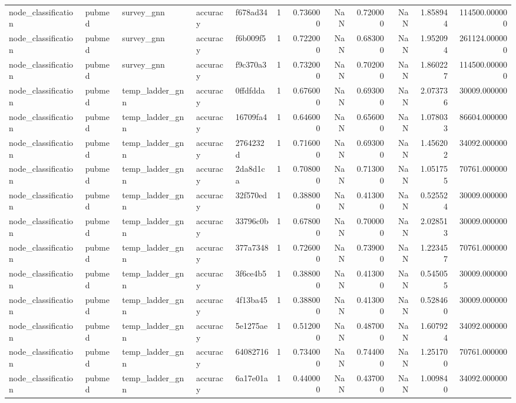 \begin{tabular}{lllllrrrrrrr}
node_classification & pubmed & survey_gnn & accuracy & f678ad34 & 1 & 0.736000 & NaN & 0.720000 & NaN & 1.858944 & 114500.000000 \\
node_classification & pubmed & survey_gnn & accuracy & f6b009f5 & 1 & 0.722000 & NaN & 0.683000 & NaN & 1.952094 & 261124.000000 \\
node_classification & pubmed & survey_gnn & accuracy & f9c370a3 & 1 & 0.732000 & NaN & 0.702000 & NaN & 1.860227 & 114500.000000 \\
node_classification & pubmed & temp_ladder_gnn & accuracy & 0ffdfdda & 1 & 0.676000 & NaN & 0.693000 & NaN & 2.073736 & 30009.000000 \\
node_classification & pubmed & temp_ladder_gnn & accuracy & 16709fa4 & 1 & 0.646000 & NaN & 0.656000 & NaN & 1.078033 & 86604.000000 \\
node_classification & pubmed & temp_ladder_gnn & accuracy & 2764232d & 1 & 0.716000 & NaN & 0.693000 & NaN & 1.456202 & 34092.000000 \\
node_classification & pubmed & temp_ladder_gnn & accuracy & 2da8d1ca & 1 & 0.708000 & NaN & 0.713000 & NaN & 1.051755 & 70761.000000 \\
node_classification & pubmed & temp_ladder_gnn & accuracy & 32f570ed & 1 & 0.388000 & NaN & 0.413000 & NaN & 0.525524 & 30009.000000 \\
node_classification & pubmed & temp_ladder_gnn & accuracy & 33796c0b & 1 & 0.678000 & NaN & 0.700000 & NaN & 2.028513 & 30009.000000 \\
node_classification & pubmed & temp_ladder_gnn & accuracy & 377a7348 & 1 & 0.726000 & NaN & 0.739000 & NaN & 1.223457 & 70761.000000 \\
node_classification & pubmed & temp_ladder_gnn & accuracy & 3f6ce4b5 & 1 & 0.388000 & NaN & 0.413000 & NaN & 0.545055 & 30009.000000 \\
node_classification & pubmed & temp_ladder_gnn & accuracy & 4f13ba45 & 1 & 0.388000 & NaN & 0.413000 & NaN & 0.528460 & 30009.000000 \\
node_classification & pubmed & temp_ladder_gnn & accuracy & 5e1275ae & 1 & 0.512000 & NaN & 0.487000 & NaN & 1.607924 & 34092.000000 \\
node_classification & pubmed & temp_ladder_gnn & accuracy & 64082716 & 1 & 0.734000 & NaN & 0.744000 & NaN & 1.251700 & 70761.000000 \\
node_classification & pubmed & temp_ladder_gnn & accuracy & 6a17e01a & 1 & 0.440000 & NaN & 0.437000 & NaN & 1.009840 & 34092.000000 \\

\end{tabular}
